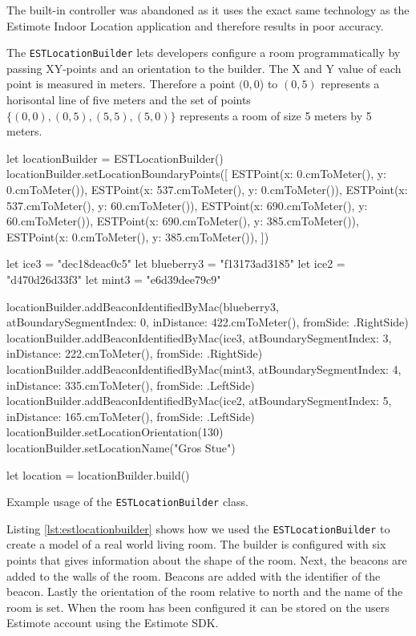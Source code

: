 The built-in controller was abandoned as it uses the exact same technology as the Estimote Indoor Location application and therefore results in poor accuracy.

The \texttt{ESTLocationBuilder} lets developers configure a room programmatically by passing XY-points and an orientation to the builder. The X and Y value of each point is measured in meters. Therefore a point $(0, 0$) to $(0, 5)$ represents a horisontal line of five meters and the set of points $\{(0,0),(0,5),(5,5),(5,0)\}$ represents a room of size 5 meters by 5 meters.

\begin{listing}
\begin{swiftcode}
        let locationBuilder = ESTLocationBuilder()
        locationBuilder.setLocationBoundaryPoints([
            ESTPoint(x: 0.cmToMeter(), y: 0.cmToMeter()),
            ESTPoint(x: 537.cmToMeter(), y: 0.cmToMeter()),
            ESTPoint(x: 537.cmToMeter(), y: 60.cmToMeter()),
            ESTPoint(x: 690.cmToMeter(), y: 60.cmToMeter()),
            ESTPoint(x: 690.cmToMeter(), y: 385.cmToMeter()),
            ESTPoint(x: 0.cmToMeter(), y: 385.cmToMeter()),
        ])
        
        let ice3 = "dec18deac0c5"
        let blueberry3 = "f13173ad3185"
        let ice2 = "d470d26d33f3"
        let mint3 = "e6d39dee79c9"
        
        locationBuilder.addBeaconIdentifiedByMac(blueberry3, atBoundarySegmentIndex: 0, inDistance: 422.cmToMeter(), fromSide: .RightSide)
        locationBuilder.addBeaconIdentifiedByMac(ice3, atBoundarySegmentIndex: 3, inDistance: 222.cmToMeter(), fromSide: .RightSide)
        locationBuilder.addBeaconIdentifiedByMac(mint3, atBoundarySegmentIndex: 4, inDistance: 335.cmToMeter(), fromSide: .LeftSide)
        locationBuilder.addBeaconIdentifiedByMac(ice2, atBoundarySegmentIndex: 5, inDistance: 165.cmToMeter(), fromSide: .LeftSide)
        locationBuilder.setLocationOrientation(130)
        locationBuilder.setLocationName("Gros Stue")
        
        let location = locationBuilder.build()
\end{swiftcode}
\caption{Example usage of the \texttt{ESTLocationBuilder} class.}
\label{lst:estlocationbuilder}
\end{listing}

Listing \ref{lst:estlocationbuilder} shows how we used the \texttt{ESTLocationBuilder} to create a model of a real world living room. The builder is configured with six points that gives information about the shape of the room. Next, the beacons are added to the walls of the room. Beacons are added with the identifier of the beacon. Lastly the orientation of the room relative to north and the name of the room is set. When the room has been configured it can be stored on the users Estimote account using the Estimote SDK.

